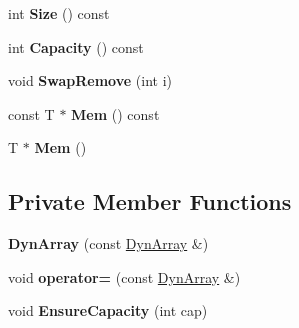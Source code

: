 \begin{DoxyCompactItemize}
\item 
int {\bfseries Size} () const \hypertarget{classtinyxml2_1_1DynArray_a5c3874dd4d5d0bf32919161b19ac7287}{}\label{classtinyxml2_1_1DynArray_a5c3874dd4d5d0bf32919161b19ac7287}

\item 
int {\bfseries Capacity} () const \hypertarget{classtinyxml2_1_1DynArray_a5ab6ef31e984e5cf78d0eb70ad3aec6d}{}\label{classtinyxml2_1_1DynArray_a5ab6ef31e984e5cf78d0eb70ad3aec6d}

\item 
void {\bfseries Swap\+Remove} (int i)\hypertarget{classtinyxml2_1_1DynArray_aa72c644f8b5e9ec5dab5b66c88f5665f}{}\label{classtinyxml2_1_1DynArray_aa72c644f8b5e9ec5dab5b66c88f5665f}

\item 
const T $\ast$ {\bfseries Mem} () const \hypertarget{classtinyxml2_1_1DynArray_aef95a07fb624948d8ce3e638ab2e1f8b}{}\label{classtinyxml2_1_1DynArray_aef95a07fb624948d8ce3e638ab2e1f8b}

\item 
T $\ast$ {\bfseries Mem} ()\hypertarget{classtinyxml2_1_1DynArray_a2f0842cd666e2ad951f1a8bd6561fa40}{}\label{classtinyxml2_1_1DynArray_a2f0842cd666e2ad951f1a8bd6561fa40}

\end{DoxyCompactItemize}
\subsection*{Private Member Functions}
\begin{DoxyCompactItemize}
\item 
{\bfseries Dyn\+Array} (const \hyperlink{classtinyxml2_1_1DynArray}{Dyn\+Array} \&)\hypertarget{classtinyxml2_1_1DynArray_a8e2251588f079f2e7a4080b2c53dabea}{}\label{classtinyxml2_1_1DynArray_a8e2251588f079f2e7a4080b2c53dabea}

\item 
void {\bfseries operator=} (const \hyperlink{classtinyxml2_1_1DynArray}{Dyn\+Array} \&)\hypertarget{classtinyxml2_1_1DynArray_a46fa3bff1a6abe7cafad46707d0bb890}{}\label{classtinyxml2_1_1DynArray_a46fa3bff1a6abe7cafad46707d0bb890}

\item 
void {\bfseries Ensure\+Capacity} (int cap)\hypertarget{classtinyxml2_1_1DynArray_a30f2dec82744b45667452e6ce3d51e32}{}\label{classtinyxml2_1_1DynArray_a30f2dec82744b45667452e6ce3d51e32}

\end{DoxyCompactItemize}
